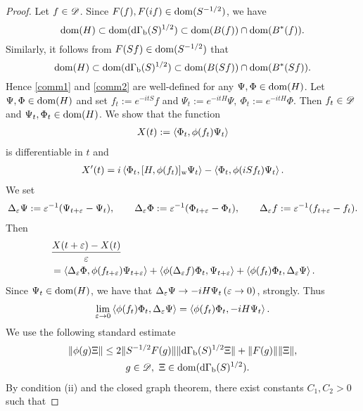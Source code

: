 \documentclass[12pt]{article}
\theoremstyle{plain}
\numberwithin{equation}{section}
\theoremstyle{remark}
\begin{document}
\begin{proof}
Let $f\in\mathscr{D}$.
Since $F(f), F(if)\in\mathop{\mathrm{dom}}(S^{-1/2})$, we have
\begin{equation}\label{dominc1}
 \mathop{\mathrm{dom}}(H)\subset\mathop{\mathrm{dom}}(\mathrm{d\Gamma_b}(S)^{1/2}) \subset \mathop{\mathrm{dom}}(B(f)) \cap \mathop{\mathrm{dom}}(B^*(f)).
\end{equation}
Similarly, it follows from $F(Sf)\in\mathop{\mathrm{dom}}(S^{-1/2})$ that
\begin{equation}\label{dominc2}
 \mathop{\mathrm{dom}}(H)\subset\mathop{\mathrm{dom}}(\mathrm{d\Gamma_b}(S)^{1/2}) \subset \mathop{\mathrm{dom}}(B(Sf)) \cap \mathop{\mathrm{dom}}(B^*(Sf)).
\end{equation}
Hence \eqref{comm1} and \eqref{comm2} are well-defined for any $\Psi,\Phi\in\mathop{\mathrm{dom}}(H)$.
Let $\Psi,\Phi\in\mathop{\mathrm{dom}}(H)$ and set 
$f_t:=e^{-itS}f$ and $\Psi_t:=e^{-itH}\Psi,~\Phi_t:=e^{-itH}\Phi$.
Then $f_t\in\mathscr{D}$ and $\Psi_t, \Phi_t\in \mathop{\mathrm{dom}}(H)$.
We show that the function
\begin{align*}
  X(t) := \left\langle\Phi_t,\phi(f_t)\Psi_t\right\rangle
\end{align*}
is differentiable in $t$ and
\begin{align}
 X'(t) 
 = i\left\langle\Phi_t,[H,\phi(f_t)]_\mathrm{w}\Psi_t\right\rangle
   -\left\langle\Phi_t,\phi(iSf_t)\Psi_t\right\rangle.   \label{eq:X'}
\end{align}
We set
\begin{align*}
\Delta_\varepsilon\Psi := \varepsilon^{-1}(\Psi_{t+\varepsilon}-\Psi_t), \qquad
\Delta_\varepsilon\Phi := \varepsilon^{-1}(\Phi_{t+\varepsilon}-\Phi_t), \qquad 
\Delta_\varepsilon f := \varepsilon^{-1}(f_{t+\varepsilon}-f_t).
\end{align*}
Then
\begin{align*}
& \frac{X(t+\varepsilon)-X(t)}{\varepsilon} \\
& = \left\langle\Delta_\varepsilon\Phi,\phi(f_{t+\varepsilon})\Psi_{t+\varepsilon}\right\rangle
 + \left\langle\phi(\Delta_\varepsilon f)\Phi_t,\Psi_{t+\varepsilon}\right\rangle
 + \left\langle\phi(f_t)\Phi_t,\Delta_\varepsilon\Psi\right\rangle.
\end{align*}
Since $\Psi_t\in\mathop{\mathrm{dom}}(H)$, 
we have that $\Delta_\varepsilon\Psi\to -iH\Psi_t \, (\varepsilon\to 0)$, strongly. Thus
\begin{align}
\lim_{\varepsilon\to 0} \left\langle\phi(f_t)\Phi_t,\Delta_\varepsilon\Psi\right\rangle
 =\left\langle\phi(f_t)\Phi_t,-iH\Psi_t\right\rangle.   \label{eqqxx1}
\end{align}
We use the following standard estimate
\begin{multline}
\| \phi(g)\Xi \| \leq 2\| S^{-1/2}F(g) \|  \| \mathrm{d\Gamma_b}(S)^{1/2}\Xi \|
  + \| F(g) \| \| \Xi \|,\\
  \quad g\in\mathscr{D}, ~ \Xi \in \mathop{\mathrm{dom}}(\mathrm{d\Gamma_b}(S)^{1/2}). \label{stdineq}
\end{multline}
By condition (ii) and the closed graph theorem, there exist constants $C_1,C_2>0$ such that 

\end{proof}
\end{document}
